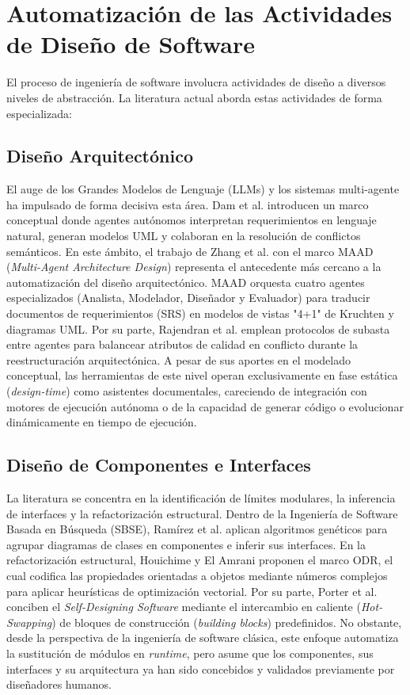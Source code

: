 \documentclass[12pt, letterpaper, oneside]{book}
\begin{document}
\section{Automatización de las Actividades de Diseño de Software} El proceso de ingeniería de software involucra actividades de diseño a diversos niveles de abstracción. La literatura actual aborda estas actividades de forma especializada: 
\subsection{Diseño Arquitectónico}

El auge de los Grandes Modelos de Lenguaje (LLMs) y los sistemas multi-agente ha impulsado de forma decisiva esta área. Dam et al. \cite{Dam2025TowardsMulti-Agentic} introducen un marco conceptual donde agentes autónomos interpretan requerimientos en lenguaje natural, generan modelos UML y colaboran en la resolución de conflictos semánticos. En este ámbito, el trabajo de Zhang et al. \cite{Maadli2025} con el marco MAAD (\textit{Multi-Agent Architecture Design}) representa el antecedente más cercano a la automatización del diseño arquitectónico. MAAD orquesta cuatro agentes especializados (Analista, Modelador, Diseñador y Evaluador) para traducir documentos de requerimientos (SRS) en modelos de vistas "4+1" de Kruchten y diagramas UML. Por su parte, Rajendran et al. \cite{Rajendran2025AMulti-Agent} emplean protocolos de subasta entre agentes para balancear atributos de calidad en conflicto durante la reestructuración arquitectónica. A pesar de sus aportes en el modelado conceptual, las herramientas de este nivel operan exclusivamente en fase estática (\textit{design-time}) como asistentes documentales, careciendo de integración con motores de ejecución autónoma o de la capacidad de generar código o evolucionar dinámicamente en tiempo de ejecución. 
\subsection{Diseño de Componentes e Interfaces} 
La literatura se concentra en la identificación de límites modulares, la inferencia de interfaces y la refactorización estructural. Dentro de la Ingeniería de Software Basada en Búsqueda (SBSE), Ramírez et al. \cite{AuroraRamirez2015234} aplican algoritmos genéticos para agrupar diagramas de clases en componentes e inferir sus interfaces. En la refactorización estructural, Houichime y El Amrani \cite{Houichime2024Optimized} proponen el marco ODR, el cual codifica las propiedades orientadas a objetos mediante números complejos para aplicar heurísticas de optimización vectorial. Por su parte, Porter et al. \cite{Porter2024SelfDesigning} conciben el \textit{Self-Designing Software} mediante el intercambio en caliente (\textit{Hot-Swapping}) de bloques de construcción (\textit{building blocks}) predefinidos. No obstante, desde la perspectiva de la ingeniería de software clásica, este enfoque automatiza la sustitución de módulos en \textit{runtime}, pero asume que los componentes, sus interfaces y su arquitectura ya han sido concebidos y validados previamente por diseñadores humanos. 
\end{document}
